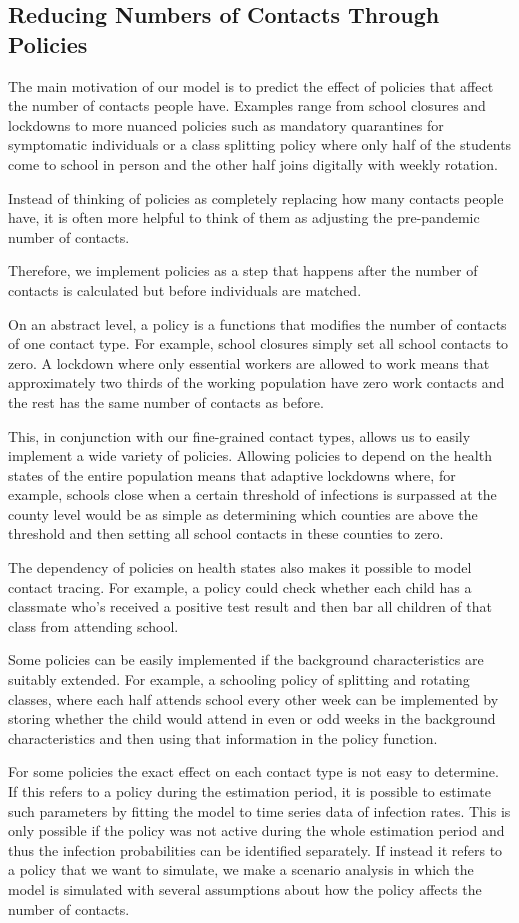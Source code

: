 \subsection{Reducing Numbers of Contacts Through Policies}
\label{sec:policies}

The main motivation of our model is to predict the effect of policies that affect the
number of contacts people have. Examples range from school closures and lockdowns to
more nuanced policies such as mandatory quarantines for symptomatic individuals or a
class splitting policy where only half of the students come to school in person and the
other half joins digitally with weekly rotation.

Instead of thinking of policies as completely replacing how many contacts people have,
it is often more helpful to think of them as adjusting the pre-pandemic number of
contacts.

Therefore, we implement policies as a step that happens after the number of contacts is
calculated but before individuals are matched.

On an abstract level, a policy is a functions that modifies the number of contacts of
one contact type. For example, school closures simply set all school contacts to zero. A
lockdown where only essential workers are allowed to work means that approximately two
thirds of the working population have zero work contacts and the rest has the same
number of contacts as before.

This, in conjunction with our fine-grained contact types, allows us to easily implement
a wide variety of policies. Allowing policies to depend on the health states of the
entire population means that adaptive lockdowns where, for example, schools close when a
certain threshold of infections is surpassed at the county level would be as simple as
determining which counties are above the threshold and then setting all school contacts
in these counties to zero.

The dependency of policies on health states also makes it possible to model contact
tracing. For example, a policy could check whether each child has a classmate who's
received a positive test result and then bar all children of that class from attending
school.

Some policies can be easily implemented if the background characteristics are suitably
extended. For example, a schooling policy of splitting and rotating classes,
where each half attends school every other week can be implemented by storing
whether the child would attend in even or odd weeks in the background characteristics
and then using that information in the policy function.

For some policies the exact effect on each contact type is not easy to determine. If
this refers to a policy during the estimation period, it is possible to estimate such
parameters by fitting the model to time series data of infection rates. This is only
possible if the policy was not active during the whole estimation period and thus the
infection probabilities can be identified separately. If instead it refers to a policy
that we want to simulate, we make a scenario analysis in which the model is simulated
with several assumptions about how the policy affects the number of contacts.
